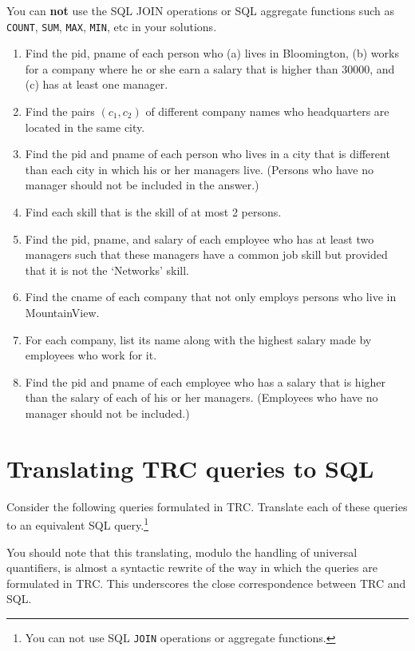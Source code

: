 \documentclass{article}
\begin{document}
 You can {\bf not} use the SQL JOIN operations or SQL aggregate functions
such as {\tt COUNT}, {\tt SUM}, {\tt MAX}, {\tt MIN}, etc in your solutions.
\begin{enumerate}[resume]
\item Find the pid, pname of each person who (a) lives in Bloomington, 
(b) works for a company where he or she earn a salary that is higher than 30000, and (c) has at least one manager.
\item Find the pairs $(c_1, c_2)$ of different company names who headquarters are located in the same city.
\item Find the pid and pname of each person who lives in a city that is different than each city in which his or her managers live.
(Persons who have no manager should not be included in the answer.)
\item Find each skill that is the skill of at most 2 persons.
\item Find the pid, pname, and salary of each employee who has at least two managers such that these managers have a common job skill but provided that it is not the `Networks' skill.
\item Find the cname of each company that not only employs persons                                                                      
who live in MountainView. 
\item For each company, list its name along with the highest salary made by employees who work for it.
\item Find the pid and pname of each employee who has a salary that is higher than the salary of each of his or her managers.
(Employees who have no manager should not be included.)

\end{enumerate}

\section{Translating TRC queries to SQL}

Consider the following queries formulated in TRC.   Translate each of these queries to an equivalent SQL query.\footnote{
You can not use SQL {\tt JOIN} operations or
aggregate functions.}

You should note that this translating, modulo the handling of universal quantifiers, is almost a syntactic rewrite of the way in which the queries are formulated in TRC.
This underscores the close correspondence between TRC and SQL.
\end{document}
